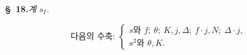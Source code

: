 
\begin{center}
\textbf{\S\ 18.}\quad\emph{계 $s_I$.}
\end{center}

\[
\text{다음의 수축: }\left\{\begin{array}{l}
s\text{와 } f;\ \theta;\ K,j,\Delta;\ f\cdot j,N;\ \Delta\cdot j,\\
s^2\text{와 }\theta,K.
\end{array}\right.
\]
